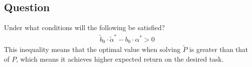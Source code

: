 \documentclass{article}
\newcommand{\td}[1]{\tilde{#1}}
\begin{document}
\subsection{Question}
Under what conditions will the following be satisfied?
\begin{align}
\td{b}_0\cdot \td{\alpha}^* - b_0\cdot \alpha^* > 0
\end{align}
This inequality means that the optimal value when solving $\td{P}$ is greater than that of $P$, which means it achieves higher expected return on the desired task.










\end{document}
